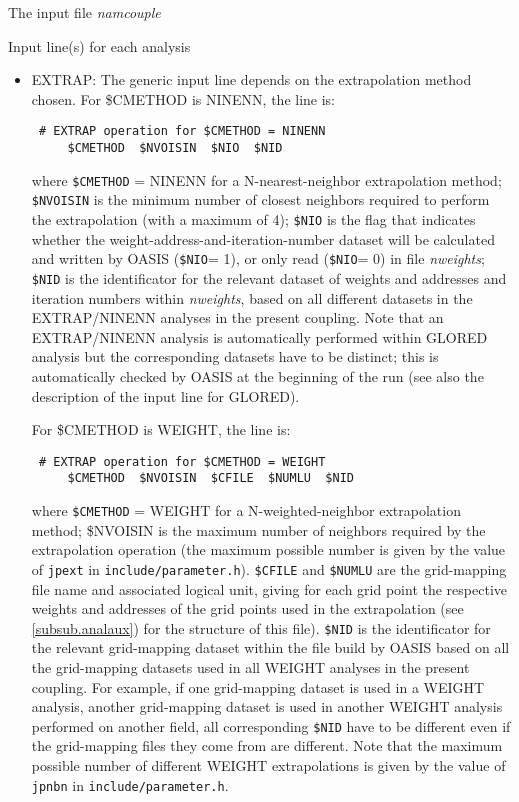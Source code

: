 \begin{subsection}{The input file {\it namcouple}}
\begin{subsubsection}{Input line(s) for each analysis}
\begin{itemize}
\item EXTRAP: The generic input line depends on the extrapolation
method chosen. For \$CMETHOD is NINENN, the line is:
\begin{verbatim}
 # EXTRAP operation for $CMETHOD = NINENN
     $CMETHOD  $NVOISIN  $NIO  $NID
\end{verbatim}
where {\tt \$CMETHOD} = NINENN for a N-nearest-neighbor extrapolation method; 
{\tt \$NVOISIN} is the minimum number of closest neighbors required 
 to perform the extrapolation (with a maximum of
4); {\tt \$NIO} is the flag that indicates whether the 
weight-address-and-iteration-number dataset will be
calculated and written by OASIS ({\tt \$NIO}= 1), or only read 
({\tt \$NIO}= 0) in
file  {\em nweights}; 
{\tt \$NID} is the identificator for the relevant dataset 
of weights and addresses and iteration numbers within {\em nweights}, 
based on all different 
datasets in the EXTRAP/NINENN analyses in the present coupling. Note
that an EXTRAP/NINENN analysis is automatically performed within 
GLORED analysis but the corresponding datasets have to be distinct;
this is automatically checked by OASIS at the beginning of the run
 (see also the description of the input line for GLORED).

For \$CMETHOD is WEIGHT, the line is:
\begin{verbatim}
 # EXTRAP operation for $CMETHOD = WEIGHT
     $CMETHOD  $NVOISIN  $CFILE  $NUMLU  $NID
\end{verbatim}
 where {\tt \$CMETHOD} = WEIGHT for a N-weighted-neighbor
extrapolation method; \$NVOISIN is the maximum number of neighbors
required by the 
extrapolation operation (the maximum possible number is given by the
value of {\tt jpext} in {\tt include/parameter.h}). 
{\tt \$CFILE} and {\tt \$NUMLU} are the grid-mapping file name and 
associated logical unit, giving for each grid point the respective 
weights and addresses of the grid points used in the extrapolation
(see \ref{subsub.analaux}) for the structure of this file). 
{\tt \$NID} is the identificator for the relevant grid-mapping dataset 
 within the file build by OASIS based on all
the grid-mapping datasets used in all WEIGHT analyses in the present
coupling. For example, if
one grid-mapping dataset is used in a WEIGHT analysis, another
grid-mapping dataset is used in another WEIGHT analysis performed
on another field, all corresponding {\tt \$NID} have to be different
even if the grid-mapping files they come from are different. Note that
the maximum possible number of different WEIGHT extrapolations is
given by the value of {\tt jpnbn} in {\tt include/parameter.h}.


\end{itemize}
\end{subsubsection}
\end{subsection}
